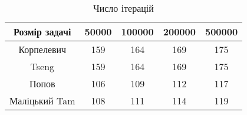 \begin{table}[H]
	\centering
	\begin{tabular}{|c||c|c|c|c|}\hline
		Розмір задачі & 50000 & 100000 & 200000 & 500000 \\ \hline \hline
		Корпелевич & 159 & 164 & 169 & 175 \\ \hline
		Tseng & 159 & 164 & 169 & 175 \\ \hline
		Попов & 106 & 109 & 112 & 117 \\ \hline
		Маліцький Tam & 108 & 111 & 114 & 119 \\ \hline
	\end{tabular}
	\caption{Число ітерацій}
\end{table}
